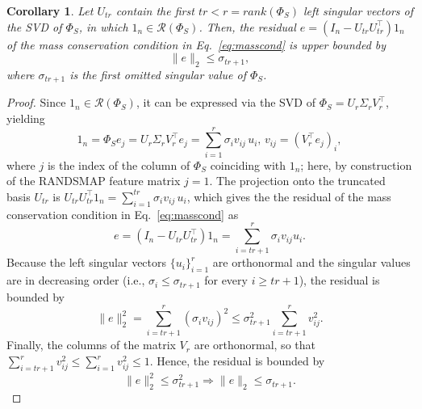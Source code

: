 \documentclass{article}
\newtheorem{corollary}{Corollary}
\begin{document}
\begin{corollary} \label{cor:cons_err_bound}
Let $U_{tr}$ contain the first $tr<r=rank(\Phi_S)$ left singular vectors of the SVD of $\Phi_S$, in which $1_n\in \mathcal{R}(\Phi_S)$. Then, the residual $e=(I_n - U_{tr} U_{tr}^\top)1_n$ of the mass conservation condition in Eq.~\eqref{eq:masscond} is upper bounded by
\begin{equation}
    \|e\|_2 \le \sigma_{tr+1},
\end{equation}
where $\sigma_{tr+1}$ is the first omitted singular value of $\Phi_S$.
\end{corollary}
\begin{proof}
Since $1_n\in \mathcal{R}(\Phi_S)$, it can be expressed via the SVD of $\Phi_S=U_r \Sigma_r V_r^\top$, yielding
\begin{equation}
    1_n = \Phi_S e_j = U_r \Sigma_r V_r^\top e_j = \sum_{i=1}^r \sigma_i v_{ij}\, u_i, \,  v_{ij}=(V_r^\top e_j)_i, 
\end{equation}
where $j$ is the index of the column of $\Phi_S$ coinciding with $1_n$; here, by construction of the RANDSMAP feature matrix $j=1$. The projection onto the truncated basis $U_{tr}$ is $U_{tr}U_{tr}^\top1_n=\sum_{i=1}^{tr} \sigma_i v_{ij}\, u_i$, which gives the the residual of the mass conservation condition in Eq.~\eqref{eq:masscond} as
\begin{equation}
e=(I_n - U_{tr} U_{tr}^\top)1_n=\sum_{i=tr+1}^r \sigma_i v_{ij} u_i.
\end{equation}
Because the left singular vectors $\{u_i\}^r_{i=1}$ are orthonormal and the singular values are in decreasing order (i.e., $\sigma_i\le\sigma_{tr+1}$ for every $i\ge tr+1$), the residual is bounded by
\begin{equation}
    \|e\|_2^2 = \sum_{i=tr+1}^r (\sigma_i v_{ij})^2 \le \sigma_{tr+1}^2 \sum_{i=tr+1}^r v_{ij}^2.
\end{equation}
Finally, the columns of the matrix $V_r$ are orthonormal, so that $\sum_{i=tr+1}^r v_{ij}^2 \le \sum_{i=1}^r v_{ij}^2 \le 1$. Hence, the residual is bounded by
\begin{equation}
   \|e\|_2^2 \le \sigma_{tr+1}^2 \Rightarrow \|e\|_2 \le \sigma_{tr+1}.
\end{equation}
\end{proof}
\end{document}
